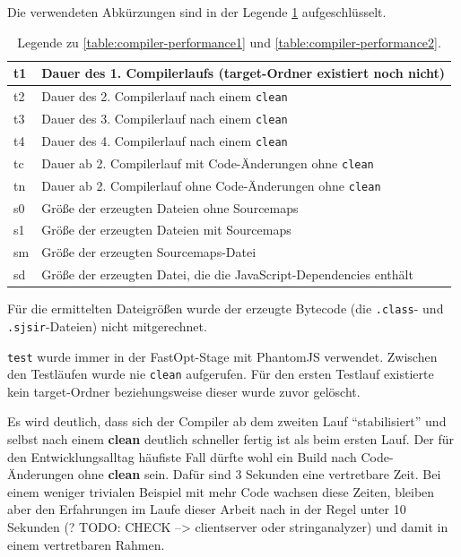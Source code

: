 \documentclass[a4paper, 12pt, hidelinks, listof=totoc, listoftables=totoc, bibliography=totoc]{scrreprt}
\begin{document}
\medskip

Die verwendeten Abkürzungen sind in der Legende \ref{table:compiler-performance-legend} aufgeschlüsselt.

\medskip

\begin{table}[!h]
\begin{tabular}{|l|l|}
\hline t1 & Dauer des 1. Compilerlaufs (target-Ordner existiert noch nicht) \\ 
\hline t2 & Dauer des 2. Compilerlauf nach einem \texttt{clean} \\ 
\hline t3 & Dauer des 3. Compilerlauf nach einem \texttt{clean} \\ 
\hline t4 & Dauer des 4. Compilerlauf nach einem \texttt{clean} \\ 
\hline tc & Dauer ab 2. Compilerlauf mit Code-Änderungen ohne \texttt{clean} \\ 
\hline tn & Dauer ab 2. Compilerlauf ohne Code-Änderungen ohne \texttt{clean} \\ 
\hline s0 & Größe der erzeugten Dateien ohne Sourcemaps \\ 
\hline s1 & Größe der erzeugten Dateien mit Sourcemaps \\ 
\hline sm & Größe der erzeugten Sourcemaps-Datei \\ 
\hline sd & Größe der erzeugten Datei, die die JavaScript-Dependencies enthält \\ 
\hline 
\end{tabular} 
\caption{Legende zu \ref{table:compiler-performance1} und \ref{table:compiler-performance2}.}
\label{table:compiler-performance-legend}
\end{table}

\medskip

Für die ermittelten Dateigrößen wurde der erzeugte Bytecode (die \texttt{.class}- und \texttt{.sjsir}-Dateien) nicht mitgerechnet.

\texttt{test} wurde immer in der FastOpt-Stage mit PhantomJS verwendet. Zwischen den Testläufen wurde nie \texttt{clean} aufgerufen. Für den ersten Testlauf existierte kein target-Ordner beziehungsweise dieser wurde zuvor gelöscht.

Es wird deutlich, dass sich der Compiler ab dem zweiten Lauf "`stabilisiert"' und selbst nach einem \textbf{clean} deutlich schneller fertig ist als beim ersten Lauf. Der für den Entwicklungsalltag häufiste Fall dürfte wohl ein Build nach Code-Änderungen ohne \textbf{clean} sein. Dafür sind 3 Sekunden eine vertretbare Zeit. Bei einem weniger trivialen Beispiel mit mehr Code wachsen diese Zeiten, bleiben aber den Erfahrungen im Laufe dieser Arbeit nach in der Regel unter 10 Sekunden (? TODO: CHECK --> clientserver oder stringanalyzer) und damit in einem vertretbaren Rahmen.
\end{document}
